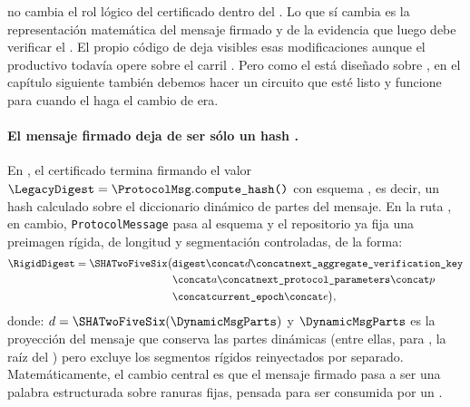 \Lagrange no cambia el rol lógico del certificado dentro del \zkBridge. Lo que sí cambia es la representación matemática del mensaje firmado y de la evidencia que luego debe verificar el \zkBridge. El propio código de \Mithril deja visibles esas modificaciones aunque el \MithrilAggregator productivo todavía opere sobre el carril \Pythagoras. Pero como el \zkBridge está diseñado sobre \Lagrange, en el capítulo siguiente también debemos hacer un circuito que esté listo y funcione para cuando el \MithrilAggregator haga el cambio de era.

\paragraph{El mensaje firmado deja de ser sólo un hash \LegacyHashScheme.}
En \Pythagoras, el certificado termina firmando el valor $ \LegacyDigest = \ProtocolMsg.\texttt{compute\_hash()}$ con esquema \LegacyHashScheme, es decir, un hash calculado sobre el diccionario dinámico de partes del mensaje. En la ruta \Lagrange, en cambio, \texttt{ProtocolMessage} pasa al esquema \RigidHashScheme y el repositorio ya fija una preimagen rígida, de longitud y segmentación controladas, de la forma:
$$
\begin{aligned}
\RigidDigest = \SHATwoFiveSix \bigl(&\texttt{digest} \concat d \concat \texttt{next\_aggregate\_verification\_key} \\
&\concat a \concat \texttt{next\_protocol\_parameters} \concat p \\
&\concat \texttt{current\_epoch} \concat e \bigr),
\end{aligned}
$$
donde: $d = \SHATwoFiveSix(\DynamicMsgParts)$ y \(\DynamicMsgParts\) es la proyección del mensaje que conserva las partes dinámicas (entre ellas, para \CardanoTransactions, la raíz del \Snapshot) pero excluye los segmentos rígidos reinyectados por separado. Matemáticamente, el cambio central es que el mensaje firmado pasa a ser una palabra estructurada sobre ranuras fijas, pensada para ser consumida por un \SNARK \cite{MithrilSTMRepo}.

